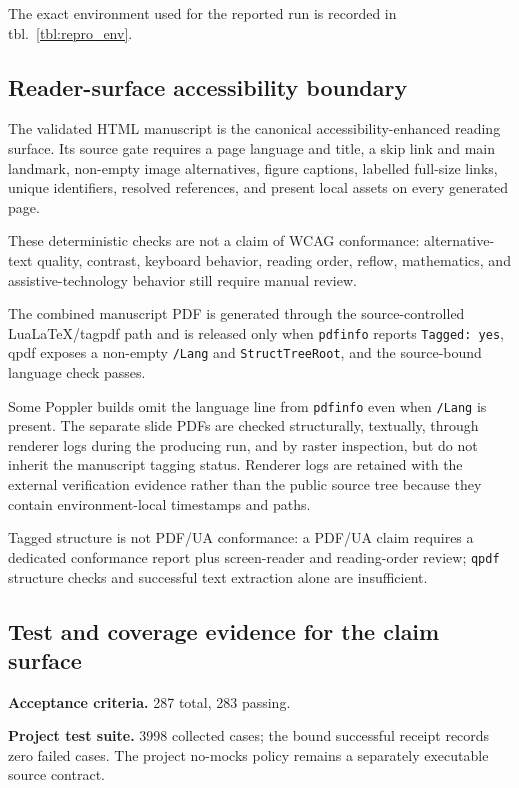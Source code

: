 \documentclass[
  english,
]{article}
\theoremstyle{plain}
\theoremstyle{definition}
\theoremstyle{remark}
\theoremstyle{definition}
\begin{document}
The exact environment used for the reported run is recorded in
tbl.~\ref{tbl:repro_env}.

\subsection{Reader-surface accessibility
boundary}\label{sec:repro-accessibility}

The validated HTML manuscript is the canonical accessibility-enhanced
reading surface. Its source gate requires a page language and title, a
skip link and main landmark, non-empty image alternatives, figure
captions, labelled full-size links, unique identifiers, resolved
references, and present local assets on every generated page.

These deterministic checks are not a claim of WCAG conformance:
alternative-text quality, contrast, keyboard behavior, reading order,
reflow, mathematics, and assistive-technology behavior still require
manual review.

The combined manuscript PDF is generated through the source-controlled
LuaLaTeX/tagpdf path and is released only when \texttt{pdfinfo} reports
\texttt{Tagged:\ yes}, qpdf exposes a non-empty \texttt{/Lang} and
\texttt{StructTreeRoot}, and the source-bound language check passes.

Some Poppler builds omit the language line from \texttt{pdfinfo} even
when \texttt{/Lang} is present. The separate slide PDFs are checked
structurally, textually, through renderer logs during the producing run,
and by raster inspection, but do not inherit the manuscript tagging
status. Renderer logs are retained with the external verification
evidence rather than the public source tree because they contain
environment-local timestamps and paths.

Tagged structure is not PDF/UA conformance: a PDF/UA claim requires a
dedicated conformance report plus screen-reader and reading-order
review; \texttt{qpdf} structure checks and successful text extraction
alone are insufficient.

\subsection{Test and coverage evidence for the claim
surface}\label{sec:repro-tests}

\textbf{Acceptance criteria.} 287 total, 283 passing.

\textbf{Project test suite.} 3998 collected cases; the bound successful
receipt records zero failed cases. The project no-mocks policy remains a
separately executable source contract.
\end{document}
